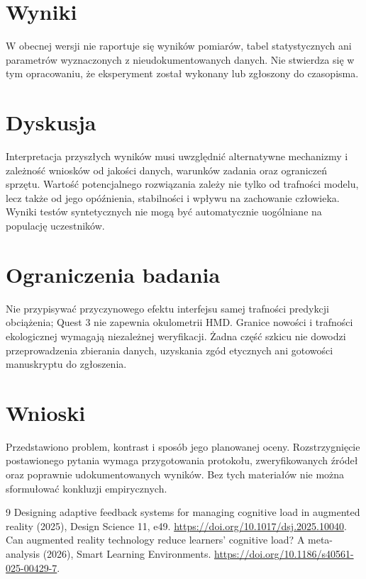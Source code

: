 \documentclass[11pt,a4paper]{article}
\begin{document}
\section{Wyniki}

W obecnej wersji nie raportuje się wyników pomiarów, tabel statystycznych ani parametrów wyznaczonych z nieudokumentowanych danych. Nie stwierdza się w tym opracowaniu, że eksperyment został wykonany lub zgłoszony do czasopisma.

\section{Dyskusja}

Interpretacja przyszłych wyników musi uwzględnić alternatywne mechanizmy i zależność wniosków od jakości danych, warunków zadania oraz ograniczeń sprzętu. Wartość potencjalnego rozwiązania zależy nie tylko od trafności modelu, lecz także od jego opóźnienia, stabilności i wpływu na zachowanie człowieka. Wyniki testów syntetycznych nie mogą być automatycznie uogólniane na populację uczestników.

\section{Ograniczenia badania}

Nie przypisywać przyczynowego efektu interfejsu samej trafności predykcji obciążenia; Quest 3 nie zapewnia okulometrii HMD. Granice nowości i trafności ekologicznej wymagają niezależnej weryfikacji. Żadna część szkicu nie dowodzi przeprowadzenia zbierania danych, uzyskania zgód etycznych ani gotowości manuskryptu do zgłoszenia.

\section{Wnioski}

Przedstawiono problem, kontrast i sposób jego planowanej oceny. Rozstrzygnięcie postawionego pytania wymaga przygotowania protokołu, zweryfikowanych źródeł oraz poprawnie udokumentowanych wyników. Bez tych materiałów nie można sformułować konkluzji empirycznych.

\begin{thebibliography}{9}
 Designing adaptive feedback systems for managing cognitive load in augmented reality (2025), Design Science 11, e49. \url{https://doi.org/10.1017/dsj.2025.10040}.
 Can augmented reality technology reduce learners' cognitive load? A meta-analysis (2026), Smart Learning Environments. \url{https://doi.org/10.1186/s40561-025-00429-7}.
\end{thebibliography}
\end{document}
